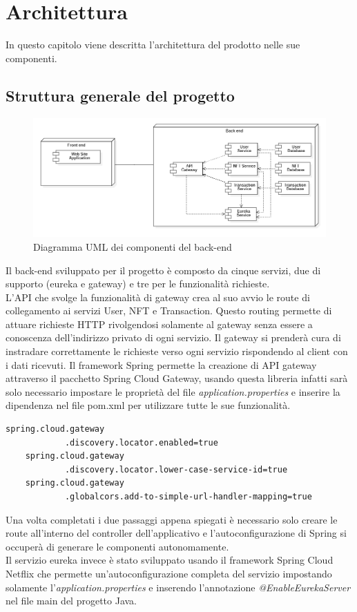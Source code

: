 \chapter{Architettura}
In questo capitolo viene descritta l'architettura del prodotto nelle sue componenti.
\section{Struttura generale del progetto}
\begin{center}
	\begin{figure}[H]
		\centering\includegraphics[scale=0.65]{./immagini/componentNFTLab.png}
		\caption{Diagramma UML dei componenti del back-end}
	\end{figure}
\end{center}
Il back-end sviluppato per il progetto è composto da cinque servizi, due di supporto (eureka e gateway) e tre per le funzionalità richieste. \\
L'API che svolge la funzionalità di gateway crea al suo avvio le route di collegamento ai servizi User, NFT e Transaction. Questo routing permette di attuare richieste HTTP rivolgendosi solamente al gateway senza essere a conoscenza dell'indirizzo privato di ogni servizio. Il gateway si prenderà cura di instradare correttamente le richieste verso ogni servizio rispondendo al client con i dati ricevuti. Il framework Spring permette la creazione di API gateway attraverso il pacchetto Spring Cloud Gateway, usando questa libreria infatti sarà solo necessario impostare le proprietà del file \emph{application.properties} e inserire la dipendenza nel file pom.xml per utilizzare tutte le sue funzionalità.
\newpage
\vspace*{0.1cm}

\begin{lstlisting}[caption=Application.properties, captionpos=b]
	spring.cloud.gateway
			.discovery.locator.enabled=true
	spring.cloud.gateway
			.discovery.locator.lower-case-service-id=true
	spring.cloud.gateway
			.globalcors.add-to-simple-url-handler-mapping=true
\end{lstlisting}
Una volta completati i due passaggi appena spiegati è necessario solo creare le route all'interno del controller dell'applicativo e l'autoconfigurazione di Spring si occuperà di generare le componenti autonomamente.
\\
Il servizio eureka invece è stato sviluppato usando il framework Spring Cloud Netflix che permette un'autoconfigurazione completa del servizio impostando solamente l'\emph{application.properties} e inserendo l'annotazione \emph{@EnableEurekaServer} nel file main del progetto Java.


